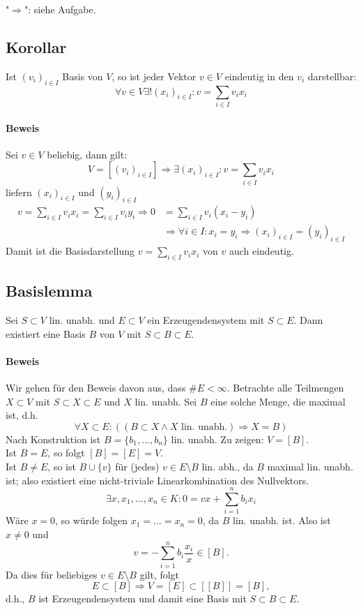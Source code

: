 	"$\Rightarrow$": siehe Aufgabe.
	
\subsection{Korollar}
	\begin{Korollar}
		Ist $(v_i)_{i\in I}$ Basis von $ V $, so ist jeder Vektor $v\in V$ eindeutig in den $v_i$ darstellbar:
		\[\forall v\in V \exists! (x_i)_{i\in I}: v = \sum_{i\in I} v_ix_i\]
	\end{Korollar}

\paragraph{Beweis}
	Sei $v\in V$ beliebig, dann gilt:
		\[V = [(v_i)_{i\in I}] \Rightarrow \exists (x_i)_{i\in I}: v = \sum_{i\in I} v_ix_i\]
	liefern $(x_i)_{i\in I}$ und $(y_i)_{i\in I}$
	\begin{align*}
		v = \sum_{i\in I} v_ix_i = \sum_{i\in I}v_iy_i \Rightarrow 0 &= \sum_{i\in I} v_i(x_i-y_i)\\
                &\Rightarrow \forall i\in I: x_i = y_i \Rightarrow (x_i)_{i\in I} = (y_i)_{i\in I}
	\end{align*}
	Damit ist die Basisdarstellung $v = \sum_{i\in I} v_ix_i$ von $v$ auch eindeutig.

\subsection{Basislemma}
    \begin{Lemma}[Basislemma]
    	Sei $S\subset V$ lin. unabh. und $E\subset V$ ein Erzeugendensystem mit $S\subset E$. Dann existiert eine Basis $B$ von $V$ mit $S\subset B\subset E$.
    \end{Lemma}

\paragraph{Beweis}
    Wir gehen für den Beweis davon aus, dass $\#E<\infty$. Betrachte alle Teilmengen $X\subset V$ mit $S\subset X\subset E$ und $X$ lin. unabh. Sei $B$ eine solche Menge, die maximal ist, d.h.
        \[\forall X\subset E: ((B\subset X\land X\text{ lin. unabh.}) \Rightarrow X= B)\]
    Nach Konstruktion ist $B=\{b_1,...,b_n\}$ lin. unabh. Zu zeigen: $V=[B]$.\\
    Ist $B=E$, so folgt $[B]=[E]=V$.\\
    Ist $B\neq E$, so ist $B\cup \{v\} $ für (jedes) $v\in E\setminus B$ lin. abh., da $B$ maximal lin. unabh. ist; also existiert eine nicht-triviale Linearkombination des Nullvektors.
        \[\exists x,x_1,...,x_n \in K: 0=vx+\sum^n_{i=1}b_ix_i\]
    Wäre $x=0$, so würde folgen $x_1=...=x_n=0$, da $B$ lin. unabh. ist. 
    Also ist $x\neq 0$ und 
    	\[v=-\sum^n_{i=1} b_i\frac{x_i}{x} \in [B].\]
    Da dies für beliebiges $v\in E\setminus B$ gilt, folgt
    	\[E\subset [B] \Rightarrow V=[E]\subset [[B]] = [B],\]
    d.h., $ B $ ist Erzeugendensystem und damit eine Basis mit $S\subset B\subset E$.

